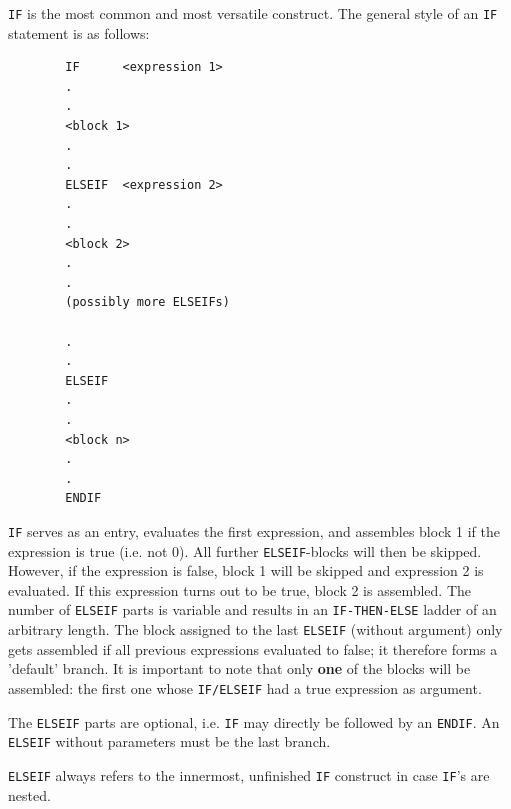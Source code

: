 \documentclass[12pt,twoside]{report}
\newcommand{\bb}[1]{{\bf #1}}
\newcommand{\tty}[1]{{\tt #1}}
\begin{document}
\tty{IF} is the most common and most versatile construct.  The general
style of an \tty{IF} statement is as follows:
\begin{verbatim}
        IF      <expression 1>
        .
        .
        <block 1>
        .
        .
        ELSEIF  <expression 2>
        .
        .
        <block 2>
        .
        .
        (possibly more ELSEIFs)

        .
        .
        ELSEIF
        .
        .
        <block n>
        .
        .
        ENDIF
\end{verbatim}
\tty{IF} serves as an entry, evaluates the first expression, and assembles
block 1 if the expression is true (i.e. not 0).  All further
\tty{ELSEIF}-blocks will then be skipped.  However, if the expression is
false, block 1 will be skipped and expression 2 is evaluated.  If this
expression turns out to be true, block 2 is assembled.  The number of
\tty{ELSEIF} parts is variable and results in an \tty{IF-THEN-ELSE} ladder
of an arbitrary length.  The block assigned to the last \tty{ELSEIF}
(without argument) only gets assembled if all previous expressions
evaluated to false; it therefore forms a 'default' branch.  It is
important to note that only \bb{one} of the blocks will be assembled: the
first one whose \tty{IF/ELSEIF} had a true expression as argument.

The \tty{ELSEIF} parts are optional, i.e. \tty{IF} may directly be
followed by an \tty{ENDIF}.  An \tty{ELSEIF} without parameters must be
the last branch.

\tty{ELSEIF} always refers to the innermost, unfinished \tty{IF} construct
in case \tty{IF}'s are nested.
\end{document}
